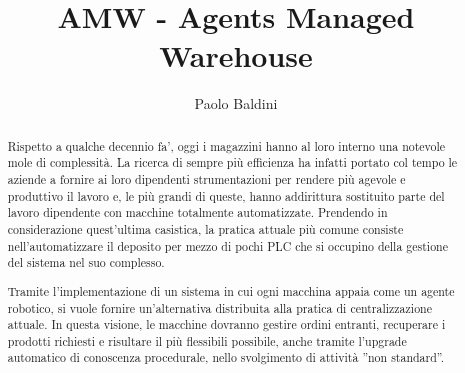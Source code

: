 \documentclass{scrartcl}
\title{\LARGE
    AMW - Agents Managed Warehouse
}
\author{
    Paolo Baldini \\ \emailaddr{paolo.baldini6@studio.unibo.it}
}
\newcommand{\parag}{\vspace{6pt}\par}
\begin{document}
\maketitle


\begin{abstract}

Rispetto a qualche decennio fa', oggi i magazzini hanno al loro interno una notevole mole di complessità. La ricerca di sempre più efficienza ha infatti portato col tempo le aziende a fornire ai loro dipendenti strumentazioni per rendere più agevole e produttivo il lavoro e, le più grandi di queste, hanno addirittura sostituito parte del lavoro dipendente con macchine totalmente automatizzate. Prendendo in considerazione quest’ultima casistica, la pratica attuale più comune consiste nell’automatizzare il deposito per mezzo di pochi PLC che si occupino della gestione del sistema nel suo complesso.
\parag
Tramite l'implementazione di un sistema in cui ogni macchina appaia come un agente robotico, si vuole fornire un’alternativa distribuita alla pratica di centralizzazione attuale. In questa visione, le macchine dovranno gestire ordini entranti, recuperare i prodotti richiesti e risultare il più flessibili possibile, anche tramite l'upgrade automatico di conoscenza procedurale, nello
svolgimento di attività ”non standard”.
\end{abstract}
\newpage

\tableofcontents
\newpage

\end{document}
